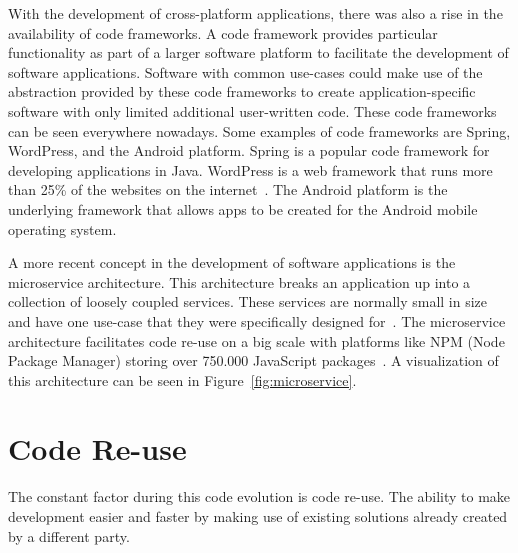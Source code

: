 With the development of cross-platform applications, there was also a rise in the availability of code frameworks. A code framework provides particular functionality as part of a larger software platform to facilitate the development of software applications. Software with common use-cases could make use of the abstraction provided by these code frameworks to create application-specific software with only limited additional user-written code. These code frameworks can be seen everywhere nowadays. Some examples of code frameworks are Spring, WordPress, and the Android platform. Spring is a popular code framework for developing applications in Java. WordPress is a web framework that runs more than 25\% of the websites on the internet~\cite{ewer201414}. The Android platform is the underlying framework that allows apps to be created for the Android mobile operating system.

A more recent concept in the development of software applications is the microservice architecture. This architecture breaks an application up into a collection of loosely coupled services. These services are normally small in size and have one use-case that they were specifically designed for~\cite{thones2015microservices}. The microservice architecture facilitates code re-use on a big scale with platforms like NPM (Node Package Manager) storing over 750.000 JavaScript packages~\cite{npmstatistics}. A visualization of this architecture can be seen in Figure~\ref{fig:microservice}.

\section{Code Re-use}

The constant factor during this code evolution is code re-use. The ability to make development easier and faster by making use of existing solutions already created by a different party.

